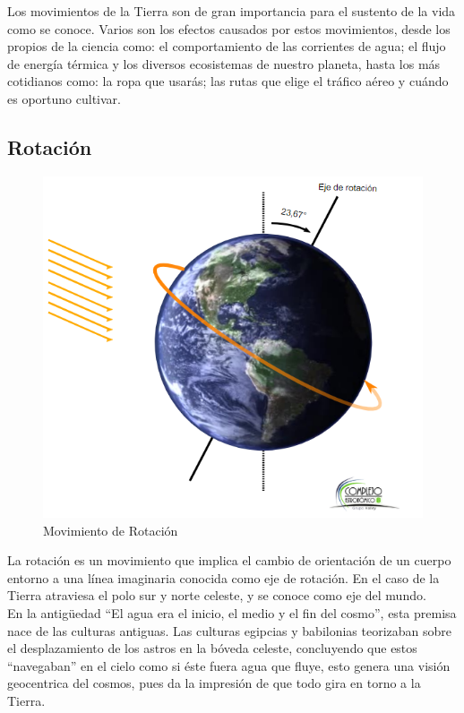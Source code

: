 \documentclass[10pt,a4paper]{article}
\begin{document}
\noindent Los movimientos de la Tierra son de gran importancia para el sustento de la vida como se conoce. Varios son los efectos causados por estos movimientos, desde los propios de la ciencia como: el comportamiento de las corrientes de agua; el flujo de energía térmica y los diversos ecosistemas de nuestro planeta, hasta los más cotidianos como: la ropa que usarás; las rutas que elige el tráfico aéreo y cuándo es oportuno cultivar. \\


\subsection{Rotación}
\begin{figure}[H]
\centering
\includegraphics[scale=0.65]{Imagenes/Rotacion_01} 
\caption{Movimiento de Rotación}
\label{m_rotacion}
\end{figure}
La rotación es un movimiento que implica el cambio de orientación de un cuerpo entorno a una línea imaginaria conocida como eje de rotación. En el caso de la Tierra atraviesa el polo sur y norte celeste, y se conoce como eje del mundo. \\

En la antigüedad ``El agua era el inicio, el medio y el fin del cosmo'', esta premisa nace de las culturas antiguas. Las culturas egipcias y babilonias teorizaban sobre el desplazamiento de los astros en la bóveda celeste, concluyendo que estos ``navegaban'' en el cielo como si éste fuera agua que fluye, esto genera una visión geocentrica del cosmos, pues da la impresión de que todo gira en torno a la Tierra. \\
\end{document}
